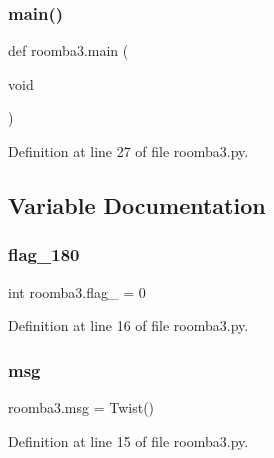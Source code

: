 \subsubsection{\texorpdfstring{main()}{main()}}
{\footnotesize\ttfamily def roomba3.\+main (\begin{DoxyParamCaption}\item[{void}]{ }\end{DoxyParamCaption})}



Definition at line 27 of file roomba3.\+py.



\subsection{Variable Documentation}
\mbox{\label{namespaceroomba3_a7dd74f0a9fc8eb831759b5de0a47955f}} 
\subsubsection{\texorpdfstring{flag\_180}{flag\_180}}
{\footnotesize\ttfamily int roomba3.\+flag\+\_ = 0}



Definition at line 16 of file roomba3.\+py.

\mbox{\label{namespaceroomba3_a2974868569b540b2f962795de8163963}} 
\subsubsection{\texorpdfstring{msg}{msg}}
{\footnotesize\ttfamily roomba3.\+msg = Twist()}



Definition at line 15 of file roomba3.\+py.

